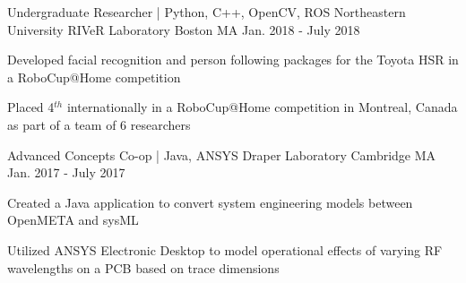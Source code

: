 \begin{cventries}
  \cventry
    {Undergraduate Researcher | Python, C++, OpenCV, ROS} %
    {Northeastern University RIVeR Laboratory} %
    {Boston MA} %
    {Jan. 2018 - July 2018} %
    {
      \begin{cvitems} %
        \item {Developed facial recognition and person following packages for the Toyota HSR in a RoboCup@Home competition}
        \item {Placed 4$^{th}$ internationally in a RoboCup@Home competition in Montreal, Canada as part of a team of 6 researchers}
      \end{cvitems}
    }

  \cventry
    {Advanced Concepts Co-op | Java, ANSYS} %
    {Draper Laboratory} %
    {Cambridge MA} %
    {Jan. 2017 - July 2017} %
    {
      \begin{cvitems} %
        \item {Created a Java application to convert system engineering models between OpenMETA and sysML}
        \item {Utilized ANSYS Electronic Desktop to model operational effects of varying RF wavelengths on a PCB based on trace dimensions}
      \end{cvitems}
    }

\end{cventries}
